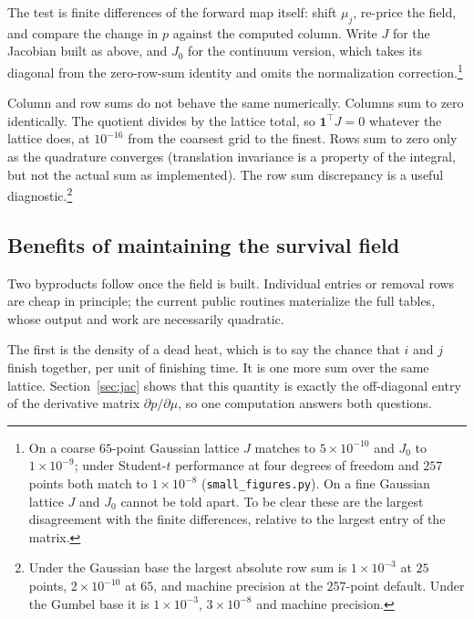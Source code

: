 \documentclass[11pt]{article}
\begin{document}
The test is finite differences of the forward map itself: shift $\mu_j$,
re-price the field, and compare the change in $p$ against the computed
column. Write $J$ for the Jacobian built as above, and $J_0$ for the
continuum version, which takes its diagonal from the zero-row-sum
identity and omits the normalization correction.\footnote{On a coarse $65$-point Gaussian lattice $J$ matches
to $5\times10^{-10}$ and $J_0$ to $1\times10^{-9}$; under Student-$t$
performance at four degrees of freedom and $257$ points both match to
$1\times10^{-8}$ (\texttt{small\_figures.py}). On a fine Gaussian
lattice $J$ and $J_0$ cannot be told apart. To be clear these are the largest disagreement with the finite differences, relative to the largest
entry of the matrix.}

Column and row sums do not behave the same numerically. Columns sum to zero identically. The quotient
divides by the lattice total, so $\mathbf{1}^{\top}J=0$ whatever the
lattice does, at $10^{-16}$ from the coarsest grid to the finest.
Rows sum to zero only as the quadrature converges (translation
invariance is a property of the integral, but not the actual sum as implemented). The row sum discrepancy is a useful diagnostic.\footnote{Under the Gaussian base the largest absolute row sum is
$1\times10^{-3}$ at $25$ points,
$2\times10^{-10}$ at $65$, and machine precision at the $257$-point
default. Under the Gumbel base it is $1\times10^{-3}$, $3\times10^{-8}$
and machine precision.}

\subsection{Benefits of maintaining the survival field}

Two byproducts follow once the field is built. Individual entries or removal rows are cheap in principle; the current public routines materialize the full tables, whose output and work are necessarily quadratic.

The first is the density of a dead heat, which is to say the chance that $i$ and $j$
finish together, per unit of finishing time. It is one more sum over the
same lattice. Section~\ref{sec:jac} shows that this quantity is exactly
the off-diagonal entry of the derivative matrix $\partial p/\partial\mu$,
so one computation answers both questions.
\end{document}
